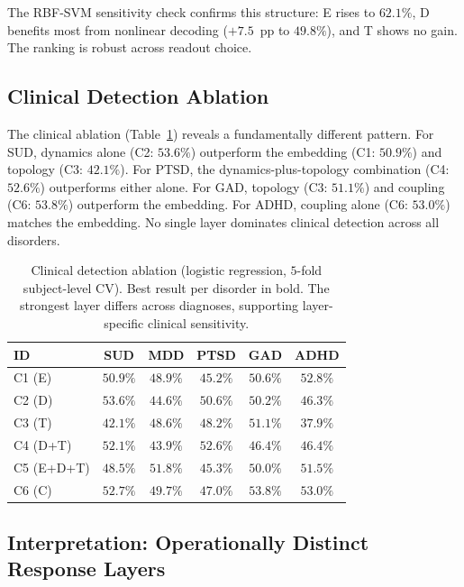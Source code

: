 The RBF-SVM sensitivity check confirms this structure: E rises to $62.1\%$, D benefits most from nonlinear decoding ($+7.5$~pp to $49.8\%$), and T shows no gain. The ranking is robust across readout choice.

\subsection{Clinical Detection Ablation}

The clinical ablation (Table~\ref{tab:clinical_ablation}) reveals a fundamentally different pattern. For SUD, dynamics alone (C2: $53.6\%$) outperform the embedding (C1: $50.9\%$) and topology (C3: $42.1\%$). For PTSD, the dynamics-plus-topology combination (C4: $52.6\%$) outperforms either alone. For GAD, topology (C3: $51.1\%$) and coupling (C6: $53.8\%$) outperform the embedding. For ADHD, coupling alone (C6: $53.0\%$) matches the embedding. No single layer dominates clinical detection across all disorders.

\begin{table}[t]
\centering
\caption{Clinical detection ablation (logistic regression, $5$-fold subject-level CV). Best result per disorder in bold. The strongest layer differs across diagnoses, supporting layer-specific clinical sensitivity.}
\label{tab:clinical_ablation}
\small
\begin{tabular}{lccccc}
\hline
\textbf{ID} & \textbf{SUD} & \textbf{MDD} & \textbf{PTSD} & \textbf{GAD} & \textbf{ADHD} \\
\hline
C1 (E) & $50.9\%$ & $48.9\%$ & $45.2\%$ & $50.6\%$ & $52.8\%$ \\
C2 (D) & $\mathbf{53.6\%}$ & $44.6\%$ & $50.6\%$ & $50.2\%$ & $46.3\%$ \\
C3 (T) & $42.1\%$ & $48.6\%$ & $48.2\%$ & $51.1\%$ & $37.9\%$ \\
C4 (D+T) & $52.1\%$ & $43.9\%$ & $\mathbf{52.6\%}$ & $46.4\%$ & $46.4\%$ \\
C5 (E+D+T) & $48.5\%$ & $\mathbf{51.8\%}$ & $45.3\%$ & $50.0\%$ & $51.5\%$ \\
C6 (C) & $52.7\%$ & $49.7\%$ & $47.0\%$ & $\mathbf{53.8\%}$ & $\mathbf{53.0\%}$ \\
\hline
\end{tabular}
\end{table}

\subsection{Interpretation: Operationally Distinct Response Layers}

